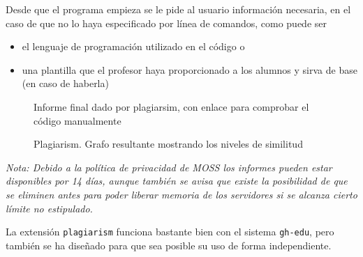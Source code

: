 Desde que el programa empieza se le pide al usuario información necesaria, en el caso de que no lo haya especificado por línea de comandos, como puede ser 
\begin{itemize}
    \item el lenguaje de programación utilizado en el código o
    \item una plantilla que el profesor haya proporcionado a los alumnos y sirva de base (en caso de haberla)
\end{itemize}

\begin{figure}[H]
    \centering
    \caption{Informe final dado por plagiarsim, con enlace para comprobar el código manualmente}
    \label{fig:reportPlagiarism}
\end{figure}

\begin{figure}[H]
    \centering
    \caption{Plagiarism. Grafo resultante mostrando los niveles de similitud}
    \label{fig:graphMossum}
\end{figure}

\emph{Nota: Debido a la política de privacidad de MOSS los informes pueden estar disponibles por 14 días, aunque también se avisa que existe la posibilidad de que se eliminen antes para poder liberar memoria de los servidores si se alcanza cierto límite no estipulado.}

La extensión \verb|plagiarism| funciona bastante bien con el sistema \verb|gh-edu|, pero también se ha diseñado para que sea posible su uso de forma independiente.
